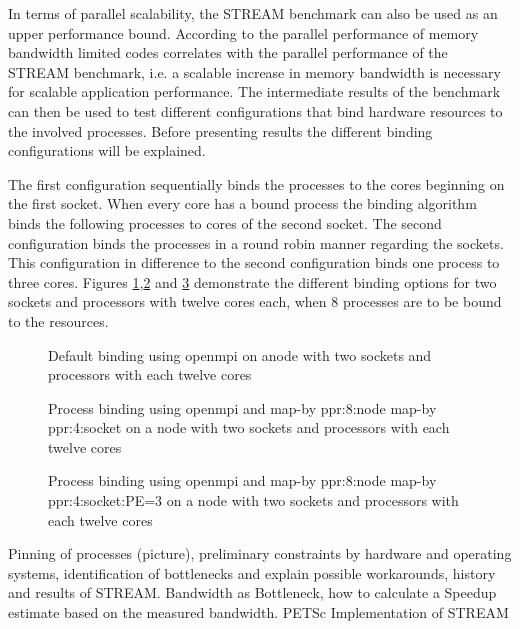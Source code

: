 In terms of parallel scalability, the STREAM benchmark can also be used as an upper performance bound. According to \cite{petsc-web-page} the parallel performance of memory bandwidth limited codes correlates with the parallel performance of the STREAM benchmark, i.e. a scalable increase in memory bandwidth is necessary for scalable application performance. The intermediate results of the benchmark can then be used to test different configurations that bind hardware resources to the involved processes. Before presenting results the different binding configurations will be explained.

The first configuration sequentially binds the processes to the cores beginning on the first socket. When every core has a bound process the binding algorithm binds the following processes to cores of the second socket. The second configuration binds the processes in a round robin manner regarding the sockets. This configuration in difference to the second configuration binds one process to three cores. Figures \ref{fig:binding1},\ref{fig:binding2} and \ref{fig:binding3} demonstrate the different binding options for two sockets and processors with twelve cores each, when 8 processes are to be bound to the resources.

\begin{figure}[h]
  \centering
  \label{fig:binding1}
    
    \centering{}
  \caption{Default binding using openmpi on anode with two sockets and processors with each twelve cores}
\end{figure}

\begin{figure}[h]
  \centering
  \label{fig:binding2}
    
    \centering{}
  \caption{Process binding using openmpi and map-by ppr:8:node map-by ppr:4:socket on a node with two sockets and processors with each twelve cores}
\end{figure}


\begin{figure}[h]
  \centering
  \label{fig:binding3}
    
    \centering{}
  \caption{Process binding using openmpi and map-by ppr:8:node map-by ppr:4:socket:PE=3 on a node with two sockets and processors with each twelve cores}
\end{figure}

        Pinning of processes (picture), preliminary constraints by hardware and operating systems, identification of bottlenecks and explain possible workarounds, history and results of STREAM. Bandwidth as Bottleneck, how to calculate a Speedup estimate based on the measured bandwidth. PETSc Implementation of STREAM

